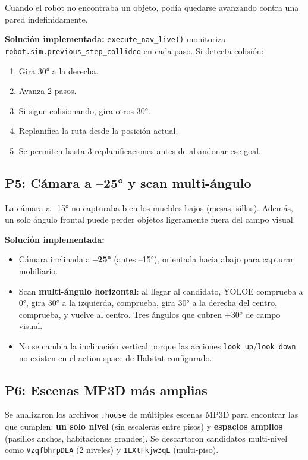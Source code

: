 \documentclass[11pt,a4paper]{article}
\begin{document}
Cuando el robot no encontraba un objeto, podía quedarse avanzando contra una pared indefinidamente.

\textbf{Solución implementada:} \texttt{execute\_nav\_live()} monitoriza \texttt{robot.sim.previous\_step\_collided} en cada paso. Si detecta colisión:
\begin{enumerate}
    \item Gira 30° a la derecha.
    \item Avanza 2 pasos.
    \item Si sigue colisionando, gira otros 30°.
    \item Replanifica la ruta desde la posición actual.
    \item Se permiten hasta 3 replanificaciones antes de abandonar ese goal.
\end{enumerate}

\subsection{P5: Cámara a --25° y scan multi-ángulo}

La cámara a --15° no capturaba bien los muebles bajos (mesas, sillas). Además, un solo ángulo frontal puede perder objetos ligeramente fuera del campo visual.

\textbf{Solución implementada:}
\begin{itemize}
    \item Cámara inclinada a \textbf{--25°} (antes --15°), orientada hacia abajo para capturar mobiliario.
    \item Scan \textbf{multi-ángulo horizontal}: al llegar al candidato, YOLOE comprueba a 0°, gira 30° a la izquierda, comprueba, gira 30° a la derecha del centro, comprueba, y vuelve al centro. Tres ángulos que cubren $\pm$30° de campo visual.
    \item No se cambia la inclinación vertical porque las acciones \texttt{look\_up}/\texttt{look\_down} no existen en el action space de Habitat configurado.
\end{itemize}

\subsection{P6: Escenas MP3D más amplias}

Se analizaron los archivos \texttt{.house} de múltiples escenas MP3D para encontrar las que cumplen: \textbf{un solo nivel} (sin escaleras entre pisos) y \textbf{espacios amplios} (pasillos anchos, habitaciones grandes). Se descartaron candidatos multi-nivel como \texttt{VzqfbhrpDEA} (2 niveles) y \texttt{1LXtFkjw3qL} (multi-piso).
\end{document}
